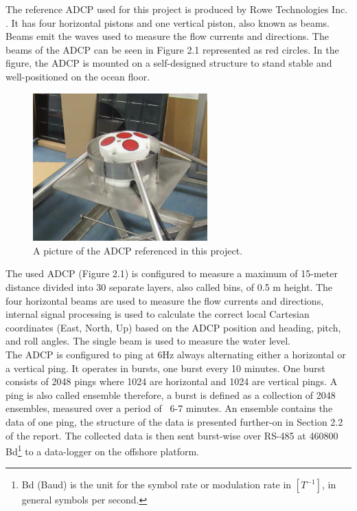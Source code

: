 The reference ADCP used for this project is produced by Rowe Technologies Inc. \cite{rowe}. It has four horizontal pistons and one vertical piston, also known as beams. Beams emit the waves used to measure the flow currents and directions. The beams of the ADCP can be seen in Figure 2.1 represented as red circles. In the figure, the ADCP is mounted on a self-designed structure to stand stable and well-positioned on the ocean floor.

\begin{figure}[h]
\centering
      \includegraphics[width=0.6\textwidth]{adcp}
        \caption{A picture of the ADCP referenced in this project.}
\end{figure}

The used ADCP (Figure 2.1) is configured to measure a maximum of 15-meter distance divided into 30 separate layers, also called bins, of 0.5 m height. The four horizontal beams are used to measure the flow currents and directions, internal signal processing is used to calculate the correct local Cartesian coordinates (East, North, Up) based on the ADCP position and heading, pitch, and roll angles. The single beam is used to measure the water level.\\
The ADCP is configured to ping at 6Hz always alternating either a horizontal or a vertical ping. It operates in bursts, one burst every 10 minutes. One burst consists of 2048 pings where 1024 are horizontal and 1024 are vertical pings. A ping is also called ensemble therefore, a burst is defined as a collection of 2048 ensembles, measured over a period of ~6-7 minutes. An ensemble contains the data of one ping, the structure of the data is presented further-on in Section 2.2 of the report. The collected data is then sent burst-wise over RS-485 at 460800 Bd\footnote{\label{foot:2} Bd (Baud) is the unit for the symbol rate or modulation rate in $[T^{-1}]$, in general symbols per second.} to a data-logger on the offshore platform.

